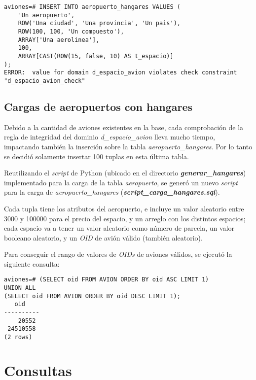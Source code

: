 \vspace*{5mm}
\lstset{style=sql}
\begin{lstlisting}
aviones=# INSERT INTO aeropuerto_hangares VALUES (
    'Un aeropuerto', 
    ROW('Una ciudad', 'Una provincia', 'Un pais'),
    ROW(100, 100, 'Un compuesto'),
    ARRAY['Una aerolinea'],
    100,
    ARRAY[CAST(ROW(15, false, 10) AS t_espacio)]
);
ERROR:  value for domain d_espacio_avion violates check constraint "d_espacio_avion_check"
\end{lstlisting}

\subsection{Cargas de aeropuertos con hangares}

Debido a la cantidad de aviones existentes en la base, cada comprobación de la regla de integridad del dominio \emph{d\_espacio\_avion} lleva mucho tiempo, impactando también la inserción sobre la tabla \emph{aeropuerto\_hangares}. Por lo tanto se decidió solamente insertar 100 tuplas en esta última tabla.

Reutilizando el \emph{script} de Python (ubicado en el directorio \textbf{\emph{generar\_hangares}}) implementado para la carga de la tabla \emph{aeropuerto}, se generó un nuevo \emph{script} para la carga de \emph{aeropuerto\_hangares} (\textbf{\emph{script\_carga\_hangares.sql}}).

Cada tupla tiene los atributos del aeropuerto, e incluye un valor aleatorio entre 3000 y 100000 para el precio del espacio, y un arreglo con los distintos espacios; cada espacio va a tener un valor aleatorio como número de parcela, un valor booleano aleatorio, y un \emph{OID} de avión válido (también aleatorio).

Para conseguir el rango de valores de \emph{OIDs} de aviones válidos, se ejecutó la siguiente consulta:  

\vspace*{5mm}
\lstset{style=sql}
\begin{lstlisting}
aviones=# (SELECT oid FROM AVION ORDER BY oid ASC LIMIT 1)
UNION ALL 
(SELECT oid FROM AVION ORDER BY oid DESC LIMIT 1);
   oid    
----------
    20552
 24510558
(2 rows)
\end{lstlisting}


\section{Consultas}

